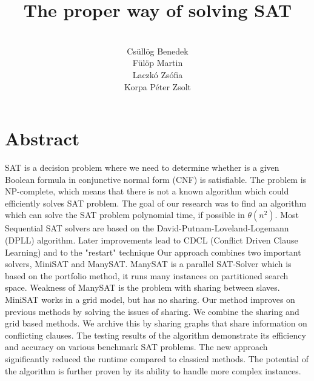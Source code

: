 \documentclass{article}
\begin{document}


\title{The proper way of solving SAT}
\author{
  \\Csüllög Benedek
  \\Fülöp Martin
  \\Laczkó Zsófia
  \\Korpa Péter Zsolt\\
}
\maketitle

\section*{Abstract}
\label{sec:abstract}

SAT is a decision problem where we need to determine whether is a given Boolean formula in conjunctive normal form (CNF) is satisfiable. The problem is NP-complete, which means that there is not a known algorithm which could efficiently solves SAT problem. 
The goal of our research was to find an algorithm which can solve the SAT problem polynomial time, if possible in $\theta(n^2)$.
Most Sequential SAT solvers are based on the David-Putnam-Loveland-Logemann (DPLL) algorithm. Later improvements lead to CDCL (Conflict Driven Clause Learning) and to the "restart" technique Our approach combines two important solvers, MiniSAT and ManySAT. 
ManySAT is a parallel SAT-Solver which is based on the portfolio method, it runs many instances on partitioned search space. Weakness of ManySAT is the problem with sharing between slaves. MiniSAT works in a grid model, but has no sharing. Our method improves on previous methods by solving the issues of sharing. We combine the sharing and grid based methods. We archive this by sharing graphs that share information on conflicting clauses. The testing results of the algorithm demonstrate its efficiency and accuracy on various benchmark SAT problems. The new approach significantly reduced the runtime compared to classical methods. The potential of the algorithm is further proven by its ability to handle more complex instances.
\end{document}
